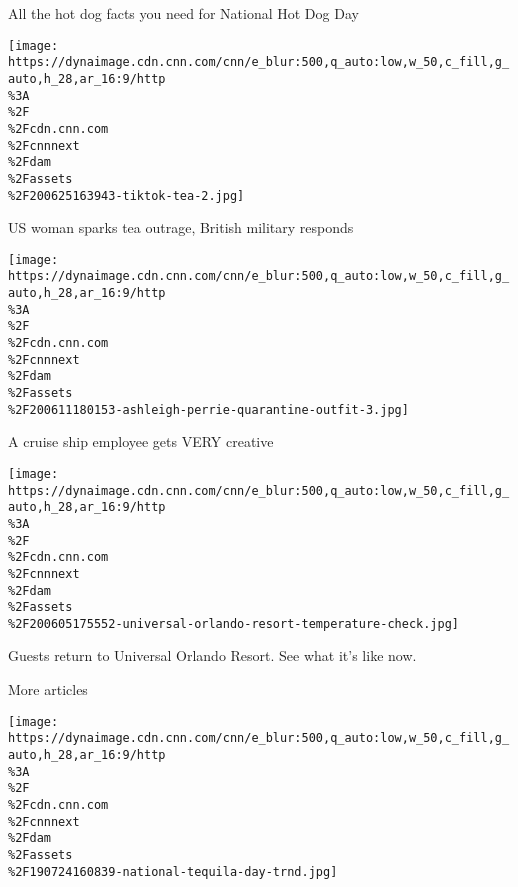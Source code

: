 \href{/travel/videos/travel/2020/07/01/hot-dog-nathans-coney-island-travel-orig.cnn}{}

All the hot dog facts you need for National Hot Dog Day

\href{/travel/videos/foodanddrink/2020/06/25/tiktok-hot-tea-diplomatic-incident-orig-llr-lc.cnn}{}

\texttt{[image: https://dynaimage.cdn.cnn.com/cnn/e\_blur:500,q\_auto:low,w\_50,c\_fill,g\_auto,h\_28,ar\_16:9/http\\\%3A\\\%2F\\\%2Fcdn.cnn.com\\\%2Fcnnnext\\\%2Fdam\\\%2Fassets\\\%2F200625163943-tiktok-tea-2.jpg]}

\href{/travel/videos/foodanddrink/2020/06/25/tiktok-hot-tea-diplomatic-incident-orig-llr-lc.cnn}{}

US woman sparks tea outrage, British military responds

\href{/travel/videos/travel/2020/06/11/cruise-employee-quarantine-paperbag-dress-travel-orig.cnn}{}

\texttt{[image: https://dynaimage.cdn.cnn.com/cnn/e\_blur:500,q\_auto:low,w\_50,c\_fill,g\_auto,h\_28,ar\_16:9/http\\\%3A\\\%2F\\\%2Fcdn.cnn.com\\\%2Fcnnnext\\\%2Fdam\\\%2Fassets\\\%2F200611180153-ashleigh-perrie-quarantine-outfit-3.jpg]}

\href{/travel/videos/travel/2020/06/11/cruise-employee-quarantine-paperbag-dress-travel-orig.cnn}{}

A cruise ship employee gets VERY creative

\href{/travel/videos/travel/2020/06/05/universal-orlando-reopen-travel-orig.cnn}{}

\texttt{[image: https://dynaimage.cdn.cnn.com/cnn/e\_blur:500,q\_auto:low,w\_50,c\_fill,g\_auto,h\_28,ar\_16:9/http\\\%3A\\\%2F\\\%2Fcdn.cnn.com\\\%2Fcnnnext\\\%2Fdam\\\%2Fassets\\\%2F200605175552-universal-orlando-resort-temperature-check.jpg]}

\href{/travel/videos/travel/2020/06/05/universal-orlando-reopen-travel-orig.cnn}{}

Guests return to Universal Orlando Resort. See what it's like now.

More articles

\href{/travel/article/national-tequila-day-2020-trnd/index.html}{}

\texttt{[image: https://dynaimage.cdn.cnn.com/cnn/e\_blur:500,q\_auto:low,w\_50,c\_fill,g\_auto,h\_28,ar\_16:9/http\\\%3A\\\%2F\\\%2Fcdn.cnn.com\\\%2Fcnnnext\\\%2Fdam\\\%2Fassets\\\%2F190724160839-national-tequila-day-trnd.jpg]}

\href{/travel/article/national-tequila-day-2020-trnd/index.html}{}

